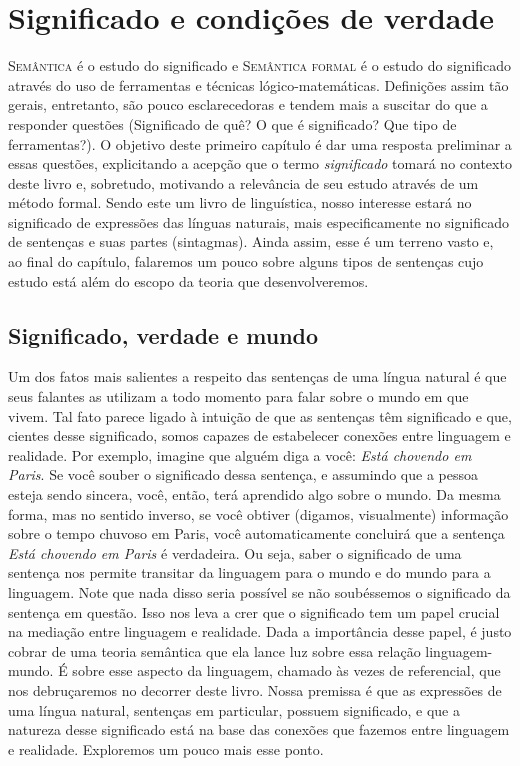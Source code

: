
\chapter{Significado e condições de verdade}


\textsc{Semântica} é o estudo do significado e \textsc{Semântica formal} é o estudo
do significado através do uso de ferramentas e técnicas
lógico-matemáticas. Definições assim tão gerais, entretanto,
são pouco esclarecedoras e tendem mais a suscitar do que a responder
questões (Significado de quê? O que é significado? Que tipo de
ferramentas?). O objetivo deste primeiro capítulo é dar uma
resposta preliminar a essas questões, explicitando a acepção que
o termo \textit{significado} tomará no contexto deste livro e,
sobretudo, motivando a relevância de seu estudo através de um
método formal. Sendo este um livro de linguística, nosso interesse
estará no significado de expressões das línguas naturais, mais
especificamente no significado de sentenças e suas partes
(sintagmas). Ainda assim, esse é um terreno vasto e, ao final do
capítulo, falaremos um pouco sobre alguns tipos de sentenças
cujo estudo está além do escopo da teoria que desenvolveremos.



\section{Significado, verdade e mundo}

Um dos fatos mais salientes a respeito das sentenças de uma língua natural é que seus falantes as utilizam a todo momento para falar sobre o mundo em que vivem. Tal fato parece ligado à intuição de que as sentenças têm significado e que, cientes desse significado, somos capazes de estabelecer conexões entre linguagem e realidade. Por exemplo, imagine que alguém diga a você: \textit{Está chovendo em Paris}. Se você souber o significado dessa sentença, e assumindo que a pessoa esteja sendo sincera, você, então, terá aprendido algo sobre o mundo. Da mesma forma, mas no sentido inverso, se você obtiver (digamos, visualmente) informação sobre o tempo chuvoso em Paris, você automaticamente concluirá que a sentença \textit{Está chovendo em Paris} é verdadeira. Ou seja, saber o significado de uma sentença nos permite transitar da linguagem para o mundo e do mundo para a linguagem. Note que nada disso seria possível se não soubéssemos o significado da sentença em questão. Isso nos leva a crer que o significado tem um papel crucial na mediação entre linguagem e realidade. Dada a importância desse papel, é justo cobrar de uma teoria semântica que ela lance luz sobre essa relação linguagem-mundo. É sobre esse aspecto da linguagem, chamado às vezes de referencial, que nos debruçaremos no decorrer deste livro. Nossa premissa é que as expressões de uma língua natural, sentenças em particular, possuem significado, e que a natureza desse significado está na base das conexões que fazemos entre linguagem e realidade. Exploremos um pouco mais esse ponto. 

